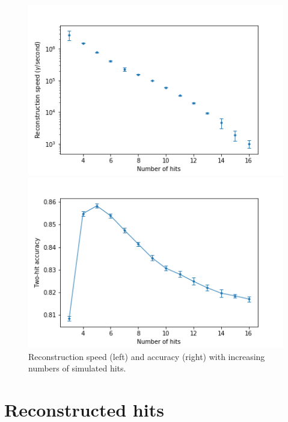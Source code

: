 \begin{figure}
    \centering
    \begin{minipage}{0.49\textwidth} \centering
        \includegraphics[width=\textwidth]{graphs/pi_hits_speed.png}
        \end{minipage}
        \begin{minipage}{0.49\textwidth} \centering
        \includegraphics[width=\textwidth]{graphs/pi_hits_acc.png}
        \end{minipage}
        \caption{Reconstruction speed (left) and accuracy (right) with increasing numbers of simulated hits.}
        \label{fig:hits_sim}
\end{figure}


\section{Reconstructed hits}
\label{reconhits}

